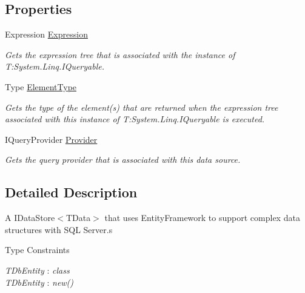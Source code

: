 \subsection*{Properties}
\begin{DoxyCompactItemize}
\item 
Expression \hyperlink{classCqrs_1_1Sql_1_1DataStores_1_1SqlDataStore_a821c821912482862e0b6143a3125e2e1_a821c821912482862e0b6143a3125e2e1}{Expression}
\begin{DoxyCompactList}\small\item\em Gets the expression tree that is associated with the instance of T\+:\+System.\+Linq.\+I\+Queryable. \end{DoxyCompactList}\item 
Type \hyperlink{classCqrs_1_1Sql_1_1DataStores_1_1SqlDataStore_a60de9af52248c2d71e2bb010e51b5c06_a60de9af52248c2d71e2bb010e51b5c06}{Element\+Type}
\begin{DoxyCompactList}\small\item\em Gets the type of the element(s) that are returned when the expression tree associated with this instance of T\+:\+System.\+Linq.\+I\+Queryable is executed. \end{DoxyCompactList}\item 
I\+Query\+Provider \hyperlink{classCqrs_1_1Sql_1_1DataStores_1_1SqlDataStore_af732efd5901590c769e2ace2a4f4f913_af732efd5901590c769e2ace2a4f4f913}{Provider}
\begin{DoxyCompactList}\small\item\em Gets the query provider that is associated with this data source. \end{DoxyCompactList}\end{DoxyCompactItemize}


\subsection{Detailed Description}
A I\+Data\+Store$<$\+T\+Data$>$ that uses Entity\+Framework to support complex data structures with S\+QL Server.\+s 

\begin{Desc}
\item[Type Constraints]\begin{description}
\item[{\em T\+Db\+Entity} : {\em class}]\item[{\em T\+Db\+Entity} : {\em new()}]\end{description}
\end{Desc}


